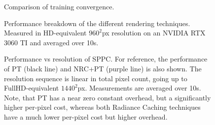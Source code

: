 \begin{figure}
    \centering
    
    \caption{Comparison of training convergence.}
    \label{fig:convergence}
\end{figure}

\begin{figure}
    \centering
    
    \caption{Performance breakdown of the different rendering techniques. Measured in HD-equivalent $960^2$px resolution on an NVIDIA RTX 3060 TI and averaged over 10s.}
    \label{fig:breakdown}
\end{figure}

\begin{figure}
    \centering
    
    \caption{Performance vs resolution of SPPC. For reference, the performance of PT (black line) and NRC+PT (purple line) is also shown. The resolution sequence is linear in total pixel count, going up to FullHD-equivalent $1440^2$px. Measurements are averaged over 10s. Note, that PT has a near zero constant overhead, but a significantly higher per-pixel cost, whereas both Radiance Caching techniques have a much lower per-pixel cost but higher overhead.}
    \label{fig:perres}
\end{figure}